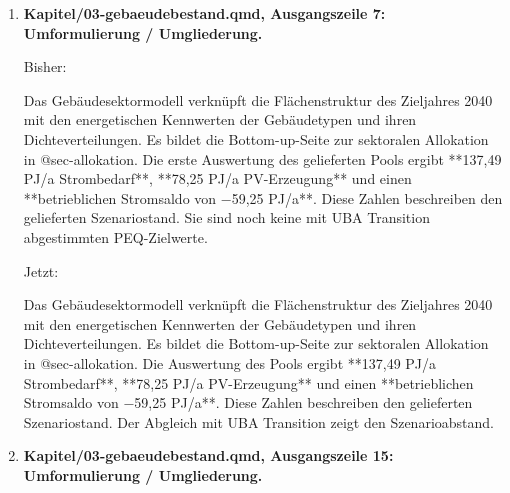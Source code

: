 \documentclass[
  ngerman,
  a4paper,
  DIV=11]{scrreprt}
\newenvironment{Shaded}{\begin{snugshade}}{\end{snugshade}}
\newcommand{\NormalTok}[1]{\textcolor[rgb]{0.00,0.23,0.31}{#1}}
\begin{document}
\begin{enumerate}
\begin{Shaded}
\begin{Highlighting}[]
\NormalTok{Die sektorale Kalibrierung erfolgt auf elektrischer Endenergiebasis. Für den Quartiersnachweis werden die Ergebnisse mit dem dokumentierten heutigen PE{-}Faktorensatz bewertet. Die nutzungsbezogene Verteilung des Mobilitätsbudgets steht in @sec{-}kontext{-}mobilitaet, die Dichte{-} und Typologiekalibrierung in @sec{-}kalibrierung. Der Entwurf dokumentiert die verwendeten Annahmen und ihren Ergebnisstand; eine normative Festlegung von PEQ{-}Flächenanteilen und neuer Dichtefunktion ist darin nicht enthalten.}
\end{Highlighting}
\end{Shaded}
\item
  \textbf{Kapitel/03-gebaeudebestand.qmd, Ausgangszeile 7:
  Umformulierung / Umgliederung.}

  Bisher:

\begin{Shaded}
\begin{Highlighting}[]
\NormalTok{Das Gebäudesektormodell verknüpft die Flächenstruktur des Zieljahres 2040 mit den energetischen Kennwerten der Gebäudetypen und ihren Dichteverteilungen. Es bildet die Bottom{-}up{-}Seite zur sektoralen Allokation in @sec{-}allokation. Die erste Auswertung des gelieferten Pools ergibt **137,49 PJ/a Strombedarf**, **78,25 PJ/a PV{-}Erzeugung** und einen **betrieblichen Stromsaldo von −59,25 PJ/a**. Diese Zahlen beschreiben den gelieferten Szenariostand. Sie sind noch keine mit UBA Transition abgestimmten PEQ{-}Zielwerte.}
\end{Highlighting}
\end{Shaded}

  Jetzt:

\begin{Shaded}
\begin{Highlighting}[]
\NormalTok{Das Gebäudesektormodell verknüpft die Flächenstruktur des Zieljahres 2040 mit den energetischen Kennwerten der Gebäudetypen und ihren Dichteverteilungen. Es bildet die Bottom{-}up{-}Seite zur sektoralen Allokation in @sec{-}allokation. Die Auswertung des Pools ergibt **137,49 PJ/a Strombedarf**, **78,25 PJ/a PV{-}Erzeugung** und einen **betrieblichen Stromsaldo von −59,25 PJ/a**. Diese Zahlen beschreiben den gelieferten Szenariostand. Der Abgleich mit UBA Transition zeigt den Szenarioabstand.}
\end{Highlighting}
\end{Shaded}
\item
  \textbf{Kapitel/03-gebaeudebestand.qmd, Ausgangszeile 15:
  Umformulierung / Umgliederung.}


\end{enumerate}
\end{document}
